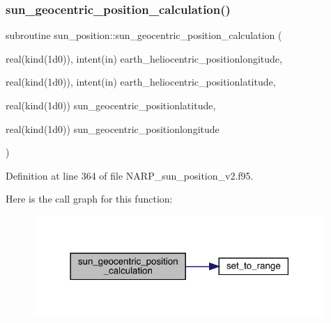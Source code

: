 \subsubsection{\texorpdfstring{sun\+\_\+geocentric\+\_\+position\+\_\+calculation()}{sun\_geocentric\_position\_calculation()}}
{\footnotesize\ttfamily subroutine sun\+\_\+position\+::sun\+\_\+geocentric\+\_\+position\+\_\+calculation (\begin{DoxyParamCaption}\item[{real(kind(1d0)), intent(in)}]{earth\+\_\+heliocentric\+\_\+positionlongitude,  }\item[{real(kind(1d0)), intent(in)}]{earth\+\_\+heliocentric\+\_\+positionlatitude,  }\item[{real(kind(1d0))}]{sun\+\_\+geocentric\+\_\+positionlatitude,  }\item[{real(kind(1d0))}]{sun\+\_\+geocentric\+\_\+positionlongitude }\end{DoxyParamCaption})}



Definition at line 364 of file N\+A\+R\+P\+\_\+sun\+\_\+position\+\_\+v2.\+f95.

Here is the call graph for this function\+:\nopagebreak
\begin{figure}[H]
\begin{center}
\leavevmode
\includegraphics[width=314pt]{_n_a_r_p__sun__position__v2_8f95_a86f9dbc3900dfe3ace869bf59bc6de68_cgraph}
\end{center}
\end{figure}
\mbox{\label{_n_a_r_p__sun__position__v2_8f95_a2b388ff5a9cd5447020b0ef32065c86b}} 
